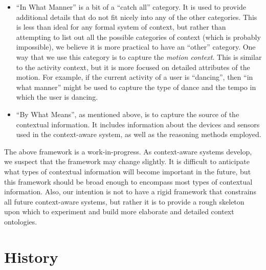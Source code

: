 \begin{itemize}
%
\item ``In What Manner'' is a bit of a ``catch all'' category. It is used to provide additional details that do not fit nicely into any of the other categories. This is less than ideal for any formal system of context, but rather than attempting to list out all the possible categories of context (which is probably impossible), we believe it is more practical to have an ``other'' category. One way that we use this category is to capture the \emph{motion context}. This is similar to the activity context, but it is more focused on detailed attributes of the motion. For example, if the current activity of a user is ``dancing'', then ``in what manner'' might be used to capture the type of dance and the tempo in which the user is dancing.
%
\item ``By What Means'', as mentioned above, is to capture the source of the contextual information. It includes information about the devices and sensors used in the context-aware system, as well as the reasoning methods employed.
\end{itemize}

The above framework is a work-in-progress. As context-aware systems develop, we suspect that the framework may change slightly. It is difficult to anticipate what types of contextual information will become important in the future, but this framework should be broad enough to encompass most types of contextual information. Also, our intention is not to have a rigid framework that constrains all future context-aware systems, but rather it is to provide a rough skeleton upon which to experiment and build more elaborate and detailed context ontologies.

\section{History}
\label{sec:history}

